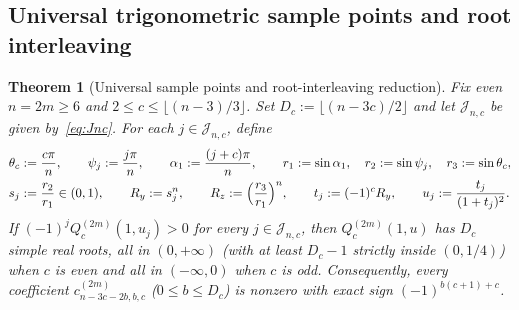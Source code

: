 \documentclass[10pt]{article}
\numberwithin{equation}{section}
\theoremstyle{plain}
\newtheorem{theorem}{Theorem}[section]
\theoremstyle{definition}
\newcommand{\1}{\mathbf{1}}
\begin{document}
\subsection{Universal trigonometric sample points and root interleaving}
\label{sec:sample-points}

\begin{theorem}[Universal sample points and root-interleaving reduction]\label{thm:sample-points}
Fix even $n = 2m \ge 6$ and $2 \le c \le \lfloor (n - 3)/3 \rfloor$. Set $D_c := \lfloor (n - 3c)/2 \rfloor$ and let $\mathcal{J}_{n,c}$ be given by~\eqref{eq:Jnc}. For each $j \in \mathcal{J}_{n, c}$, define
\begin{subequations}\label{eq:sample-params}
\begin{align}
\theta_c &:= \frac{c\pi}{n}, \qquad \psi_j := \frac{j\pi}{n}, \qquad \alpha_1 := \frac{(j + c)\pi}{n}, \qquad
r_1 := \sin\alpha_1, \quad r_2 := \sin\psi_j, \quad r_3 := \sin\theta_c, \\
s_j &:= \frac{r_2}{r_1} \in (0, 1), \qquad R_y := s_j^n, \qquad R_z := \Bigl(\frac{r_3}{r_1}\Bigr)^n, \qquad
t_j := (-1)^c R_y, \qquad u_j := \frac{t_j}{(1 + t_j)^2}.
\end{align}
\end{subequations}
If $(-1)^j Q_c^{(2m)}(1, u_j) > 0$ for every $j \in \mathcal{J}_{n, c}$, then $Q_c^{(2m)}(1, u)$ has $D_c$ simple real roots, all in $(0, +\infty)$ (with at least $D_c - 1$ strictly inside $(0, 1/4)$) when $c$ is even and all in $(-\infty, 0)$ when $c$ is odd. Consequently, every coefficient $c_{n-3c-2b, b, c}^{(2m)}$ ($0 \le b \le D_c$) is nonzero with exact sign $(-1)^{b(c+1)+c}$.
\end{theorem}
\end{document}
